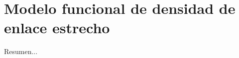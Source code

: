 \chapter{Modelo funcional de densidad de enlace estrecho}\label{ch:modelo}
\thispagestyle{empty}

\vspace{50pt}

\begin{adjustwidth}{50pt}{50pt}
    Resumen...
\end{adjustwidth}

\clearpage
\newpage
\thispagestyle{empty}
\mbox{}
\newpage








